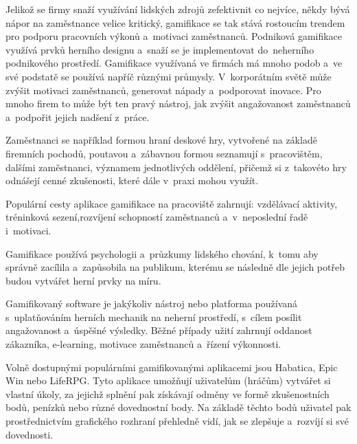 \documentclass[12pt]{article}
\begin{document}
Jelikož se firmy snaží využívání lidských zdrojů zefektivnit co nejvíce, 
někdy bývá nápor na zaměstnance velice kritický,
gamifikace se tak stává rostoucím trendem pro podporu pracovních výkonů
a~motivaci zaměstnanců.
Podniková gamifikace využívá prvků herního designu a~snaží se
je implementovat do~neherního podnikového prostředí. 
Gamifikace využívaná ve firmách
má mnoho podob a~ve své podstatě se používá napříč různými průmysly. 
V~korporátním světě může zvýšit motivaci zaměstnanců, generovat nápady a~podporovat inovace. 
Pro mnoho firem to může být ten pravý nástroj, jak zvýšit angažovanost zaměstnanců
a~podpořit jejich nadšení z~práce. 

\par 
Zaměstnanci se například formou hraní deskové hry, vytvořené na základě firemních pochodů,
poutavou a~zábavnou formou seznamují s~pracovištěm, dalšími zaměstnanci, 
významem jednotlivých oddělení,
přičemž si z~takovéto hry odnášejí cenné zkušenosti, které dále v~praxi mohou využít.

\par

Populární cesty aplikace gamifikace na pracoviště zahrnují: vzdělávací aktivity, tréninková sezení,rozvíjení schopností zaměstnanců a~v~neposlední řadě i~motivaci. 

Gamifikace používá psychologii a~průzkumy lidského chování, k~tomu aby správně zacílila a~zapůsobila na publikum,
kterému se následně dle jejich potřeb budou vytvářet herní prvky na míru.


Gamifikovaný software je jakýkoliv nástroj nebo platforma používaná s~uplatňováním herních mechanik na neherní prostředí,
s~cílem posílit angažovanost a~úspěšné výsledky.
Běžné případy užití zahrnují oddanost zákazníka, e-learning, motivace zaměstnanců a~řízení výkonnosti. 

\par

Volně dostupnými populárními gamifikovanými aplikacemi jsou Habatica, Epic Win nebo LifeRPG. 
Tyto aplikace umožňují uživatelům (hráčům) vytvářet si vlastní úkoly, 
za jejichž splnění pak získávají odměny ve formě zkušenostních bodů,
penízků nebo různé dovednostní body. 
Na základě těchto bodů uživatel pak prostřednictvím grafického rozhraní přehledně vidí,
jak se zlepšuje a~rozvíjí si své dovednosti. 

\par
\end{document}
